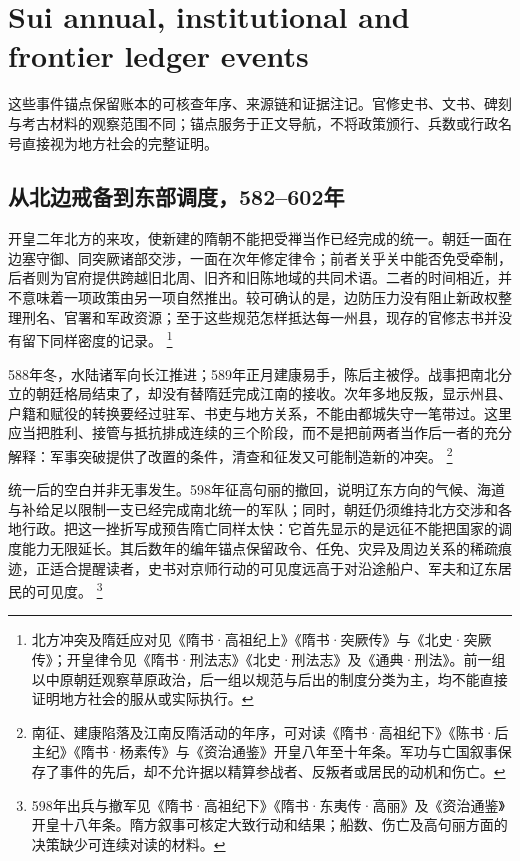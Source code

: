 \section{Sui annual, institutional and frontier ledger events}
\label{sec:sui-event-anchors-batch-two}
这些事件锚点保留账本的可核查年序、来源链和证据注记。官修史书、文书、碑刻与考古材料的观察范围不同；锚点服务于正文导航，不将政策颁行、兵数或行政名号直接视为地方社会的完整证明。

\subsection{从北边戒备到东部调度，582--602年}

开皇二年北方的来攻，使新建的隋朝不能把受禅当作已经完成的统一。朝廷一面在边塞守御、同突厥诸部交涉，一面在次年修定律令；前者关乎关中能否免受牵制，后者则为官府提供跨越旧北周、旧齐和旧陈地域的共同术语。二者的时间相近，并不意味着一项政策由另一项自然推出。较可确认的是，边防压力没有阻止新政权整理刑名、官署和军政资源；至于这些规范怎样抵达每一州县，现存的官修志书并没有留下同样密度的记录。%
\footnote{北方冲突及隋廷应对见《隋书·高祖纪上》《隋书·突厥传》与《北史·突厥传》；开皇律令见《隋书·刑法志》《北史·刑法志》及《通典·刑法》。前一组以中原朝廷观察草原政治，后一组以规范与后出的制度分类为主，均不能直接证明地方社会的服从或实际执行。}

588年冬，水陆诸军向长江推进；589年正月建康易手，陈后主被俘。战事把南北分立的朝廷格局结束了，却没有替隋廷完成江南的接收。次年多地反叛，显示州县、户籍和赋役的转换要经过驻军、书吏与地方关系，不能由都城失守一笔带过。这里应当把胜利、接管与抵抗排成连续的三个阶段，而不是把前两者当作后一者的充分解释：军事突破提供了改置的条件，清查和征发又可能制造新的冲突。%
\footnote{南征、建康陷落及江南反隋活动的年序，可对读《隋书·高祖纪下》《陈书·后主纪》《隋书·杨素传》与《资治通鉴》开皇八年至十年条。军功与亡国叙事保存了事件的先后，却不允许据以精算参战者、反叛者或居民的动机和伤亡。}

统一后的空白并非无事发生。598年征高句丽的撤回，说明辽东方向的气候、海道与补给足以限制一支已经完成南北统一的军队；同时，朝廷仍须维持北方交涉和各地行政。把这一挫折写成预告隋亡同样太快：它首先显示的是远征不能把国家的调度能力无限延长。其后数年的编年锚点保留政令、任免、灾异及周边关系的稀疏痕迹，正适合提醒读者，史书对京师行动的可见度远高于对沿途船户、军夫和辽东居民的可见度。%
\footnote{598年出兵与撤军见《隋书·高祖纪下》《隋书·东夷传·高丽》及《资治通鉴》开皇十八年条。隋方叙事可核定大致行动和结果；船数、伤亡及高句丽方面的决策缺少可连续对读的材料。}

